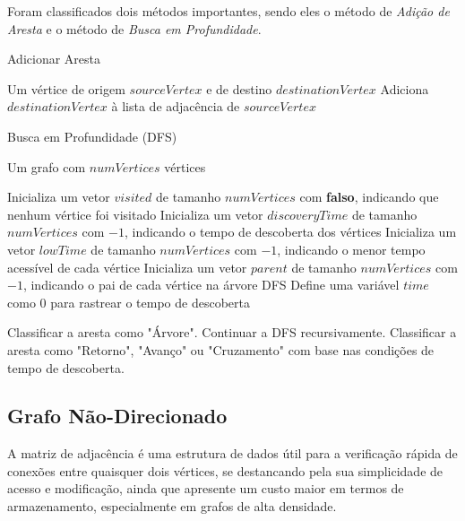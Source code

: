 \documentclass[12pt]{article}
\begin{document}
Foram classificados dois métodos importantes, sendo eles o método de \textit{Adição de Aresta} e o método de \textit{Busca em Profundidade}.

\begin{algorithm}
    \caption{Adicionar Aresta}
    \label{alg:adicionarAresta_GD}
    \begin{algorithmic}
        \Require Um vértice de origem $sourceVertex$ e de destino $destinationVertex$
        \State Adiciona $destinationVertex$ à lista de adjacência de $sourceVertex$
    \end{algorithmic}
\end{algorithm}

\begin{algorithm}
    \caption{Busca em Profundidade (DFS)}
    \label{alg:DFS}
    \begin{algorithmic}
        \Require Um grafo com $numVertices$ vértices
        
        \State Inicializa um vetor $visited$ de tamanho $numVertices$ com \textbf{falso}, indicando que nenhum vértice foi visitado
        \State Inicializa um vetor $discoveryTime$ de tamanho $numVertices$ com $-1$, indicando o tempo de descoberta dos vértices
        \State Inicializa um vetor $lowTime$ de tamanho $numVertices$ com $-1$, indicando o menor tempo acessível de cada vértice
        \State Inicializa um vetor $parent$ de tamanho $numVertices$ com $-1$, indicando o pai de cada vértice na árvore DFS
        \State Define uma variável $time$ como $0$ para rastrear o tempo de descoberta

                \State Classificar a aresta como "Árvore".
                \State Continuar a DFS recursivamente.
            \Else
                \State Classificar a aresta como "Retorno", "Avanço" ou "Cruzamento" com base nas condições de tempo de descoberta.
            \EndIf
        \EndFor
    \end{algorithmic}
\end{algorithm}


\subsection{Grafo Não-Direcionado}

A matriz de adjacência é uma estrutura de dados útil para a verificação rápida de conexões entre quaisquer dois vértices, se destancando pela sua simplicidade de acesso e modificação, ainda que apresente um custo maior em termos de armazenamento, especialmente em grafos de alta densidade.
\end{document}
